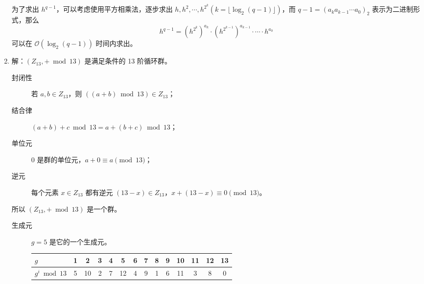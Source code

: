 \documentclass{sjtuarticle}
\begin{document}
\begin{enumerate}
    为了求出 $h^{q-1}$，可以考虑使用平方相乘法，逐步求出 $h,h^2,\cdots, h^{2^k}(k=\lfloor \log_2 (q-1) \rfloor)$，而 $q-1=(a_ka_{k-1}\cdots a_0)_2$ 表示为二进制形式，那么
    \begin{equation*}
        h^{q-1}=(h^{2^k})^{a_k}\cdot (h^{2^{k-1}})^{a_{k-1}}\cdot\cdots\cdot h^{a_0}
    \end{equation*}
    可以在 $\mathcal{O}(\log_2(q-1))$ 时间内求出。
    \item 解：$(Z_{13},+\bmod 13)$ 是满足条件的 13 阶循环群。
    \begin{description}
        \item[封闭性] 若 $a,b\in Z_{13}$，则 $((a+b)\bmod 13)\in Z_{13}$；
        \item[结合律] $(a+b)+c \bmod 13 = a+(b+c) \bmod 13$；
        \item[单位元] $0$ 是群的单位元，$a+0\equiv a\pmod{13}$；
        \item[逆元] 每个元素 $x\in Z_{13}$ 都有逆元 $(13-x)\in Z_{13}$，$x+(13-x)\equiv 0\pmod{13}$。
    \end{description}
    所以 $(Z_{13},+\bmod 13)$ 是一个群。
    \begin{description}
        \item[生成元]  $g=5$ 是它的一个生成元。
    
        \begin{tabular}{l*{13}{|c}}
        $g$          & 1 & 2  & 3 & 4 & 5  & 6 & 7 & 8 & 9 & 10 & 11 & 12 & 13\\
        \hline
        $g^i\bmod 13$ & 5 & 10 & 2 & 7 & 12 & 4 & 9 & 1 & 6 & 11 & 3  & 8  & 0 \\
        \end{tabular}
    \end{description}
    
\end{enumerate}
\end{document}
